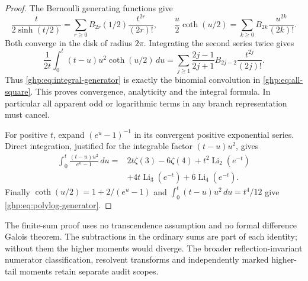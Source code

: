\begin{proof}
The Bernoulli generating functions give
\[
 \frac{t}{2\sinh(t/2)}
     =\sum_{r\geq0}B_{2r}(1/2)\frac{t^{2r}}{(2r)!},
 \qquad
 \frac u2\coth(u/2)
     =\sum_{k\geq0}B_{2k}\frac{u^{2k}}{(2k)!}.
\]
Both converge in the disk of radius $2\pi$. Integrating the second
series twice gives
\[
 \frac1{2t}\int_0^t(t-u)u^2\coth(u/2)\,du
  =\sum_{j\geq1}\frac{2j-1}{2j+1}B_{2j-2}
                  \frac{t^{2j}}{(2j)!}.
\]
Thus \eqref{ghp:eq:integral-generator} is exactly the binomial
convolution in \eqref{ghp:eq:all-square}. This proves convergence,
analyticity and the integral formula. In particular all apparent odd
or logarithmic terms in any branch representation must cancel.

For positive $t$, expand $(e^u-1)^{-1}$ in its convergent positive
exponential series. Direct integration, justified for the integrable
factor $(t-u)u^2$, gives
\begin{align*}
 \int_0^t\frac{(t-u)u^2}{e^u-1}\,du
  ={}&2t\zeta(3)-6\zeta(4)
      +t^2\operatorname{Li}_2(e^{-t})\\
     &+4t\operatorname{Li}_3(e^{-t})
      +6\operatorname{Li}_4(e^{-t}).
\end{align*}
Finally $\coth(u/2)=1+2/(e^u-1)$ and
$\int_0^t(t-u)u^2\,du=t^4/12$ give
\eqref{ghp:eq:polylog-generator}.
\end{proof}


The finite-sum proof uses no transcendence assumption and no formal
difference Galois theorem. The subtractions in the ordinary sums are part
of each identity; without them the higher moments would diverge. The
broader reflection-invariant numerator classification, resolvent transforms
and independently marked higher-tail moments retain separate audit scopes.
